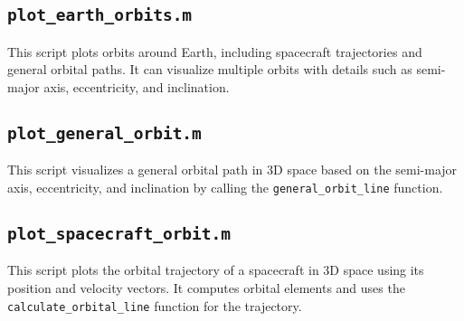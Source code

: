 \documentclass{article}
\begin{document}
	\subsection{\texttt{plot\_earth\_orbits.m}}
	This script plots orbits around Earth, including spacecraft trajectories and general orbital paths. It can visualize multiple orbits with details such as semi-major axis, eccentricity, and inclination.
	
	\subsection{\texttt{plot\_general\_orbit.m}}
	This script visualizes a general orbital path in 3D space based on the semi-major axis, eccentricity, and inclination by calling the \texttt{general\_orbit\_line} function.
	
	\subsection{\texttt{plot\_spacecraft\_orbit.m}}
	This script plots the orbital trajectory of a spacecraft in 3D space using its position and velocity vectors. It computes orbital elements and uses the \texttt{calculate\_orbital\_line} function for the trajectory.
	
	
	
\end{document}
